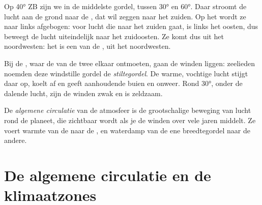 \begin{example}\label{ex:g8:winds-global-circulation:40s}
Op \ang{40} ZB zijn we in de middelste gordel, tussen \ang{30} en
\ang{60}. Daar stroomt de lucht aan de grond naar de , dat wil zeggen
naar het zuiden. Op het  wordt ze naar links afgebogen:
voor lucht die naar het zuiden gaat, is links het oosten, dus beweegt de
lucht uiteindelijk naar het zuidoosten. Ze komt dus uit het noordwesten:
het is een van de , uit het noordwesten.
\end{example}

Bij de , waar de  van de twee  elkaar
ontmoeten, gaan de winden liggen: zeelieden noemden deze windstille gordel
de \emph{stiltegordel}. De warme, vochtige lucht stijgt daar op, koelt af
en geeft aanhoudende buien en onweer. Rond \ang{30}, onder de dalende
lucht, zijn de winden zwak en is  zeldzaam.

\begin{definition}\label{def:g8:winds-global-circulation:circulation}
De \emph{algemene circulatie} van de atmosfeer
is de grootschalige beweging van lucht rond de planeet, die zichtbaar wordt
als je de winden over vele jaren middelt. Ze voert warmte van de 
naar de , en waterdamp van de ene breedtegordel naar de andere.
\end{definition}

\section{De algemene circulatie en de klimaatzones}

